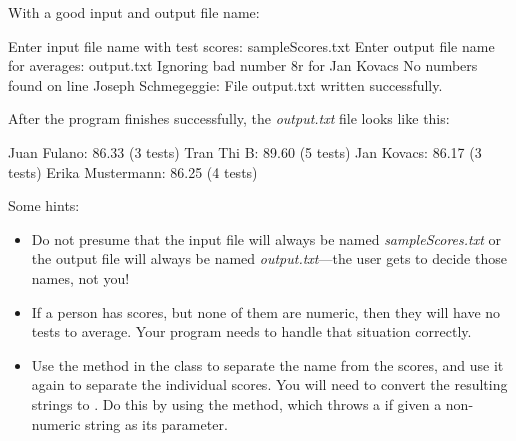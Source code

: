 \begin{exercise}
With a good input and output file name:

\begin{stdout}
Enter input file name with test scores: sampleScores.txt
Enter output file name for averages: output.txt
Ignoring bad number  8r for Jan Kovacs
No numbers found on line Joseph Schmegeggie:
File output.txt written successfully.
\end{stdout}

After the program finishes successfully, the {\em output.txt} file looks like this:

\begin{stdout}
Juan Fulano: 86.33 (3 tests)
Tran Thi B: 89.60 (5 tests)
Jan Kovacs: 86.17 (3 tests)
Erika Mustermann: 86.25 (4 tests)
\end{stdout}

Some hints:

\begin{itemize}
\item Do not presume that the input file will always be named {\em sampleScores.txt} or the output file will always be named {\em output.txt}---the user gets to decide those names, not you!
\item  If a person has scores, but none of them are numeric, then they will have no tests to average. Your program needs to handle that situation correctly.
\item Use the  method in the  class to separate the name from the scores, and use it again to separate the individual scores. You will need to convert the resulting strings to . Do this by using the  method, which throws a  if given a non-numeric string as its parameter.
\end{itemize}

\end{exercise}


